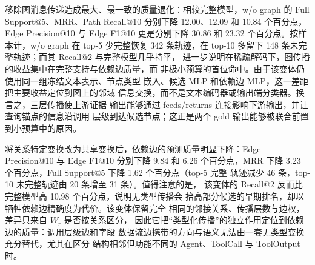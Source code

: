 \begin{table}[t]
\centering
\small
\setlength{\tabcolsep}{3pt}
\caption{合成 2Wiki 执行溯源基准上的 EPGM R-GCN 组件消融（\%）。
EdgeP@10 与 EdgeF1@10 分别为 Edge Precision@10 与 Edge F1@10。
$^{\dagger}$交付的 rerank-off 行与 full 行使用不同的 full-architecture
checkpoint，因此只作为诊断，不是配对的纯推理消融。}
\label{tab:provenance-ablation}
\end{table}

移除图消息传递造成最大、最一致的质量退化：相较完整模型，w/o graph
的 Full Support@5、MRR、Path Recall@10 分别下降 12.00、12.09 和 10.84
个百分点，Edge Precision@10 与 Edge F1@10 更是分别下降 30.86 和 23.32
个百分点。按样本计，w/o graph 在 top-5 少完整恢复 342 条轨迹，在
top-10 多留下 148 条未完整轨迹；而其 Recall@2 与完整模型几乎持平，
进一步说明在稀疏解码下，图传播的收益集中在完整支持与依赖边质量，而
非极小预算的首位命中。由于该变体仍使用同一组冻结文本表示、节点类型
嵌入、候选 MLP 和依赖边 MLP，这一差距把主要收益定位到图上的邻域
信息交换，而不是文本编码器或输出端分类器。换言之，三层传播使上游证据
输出能够通过 feeds/returns 连接影响下游输出，并让查询锚点的信息沿调用
层级到达候选节点；这正是两个 gold 输出能够被联合前置到小预算中的原因。

将关系特定变换改为共享变换后，依赖边的预测质量明显下降：Edge
Precision@10 与 Edge F1@10 分别下降 9.84 和 6.26 个百分点，MRR
下降 3.23 个百分点，Full Support@5 下降 1.62 个百分点（top-5 完整
轨迹减少 46 条，top-10 未完整轨迹由 20 条增至 31 条）。值得注意的是，
该变体的 Recall@2 反而比完整模型高 10.98 个百分点，说明无类型传播会
抬高部分候选的早期排名，却以牺牲依赖边精确度为代价。该变体保留完全
相同的邻接关系、传播层数与边权，差异只来自 $W_r$ 是否按关系区分，
因此它把“类型化传播”的独立作用定位到依赖边的质量：调用层级边和字段
数据流边携带的方向与语义无法由一套无类型变换充分替代，尤其在区分
结构相邻但功能不同的 Agent、ToolCall 与 ToolOutput 时。

